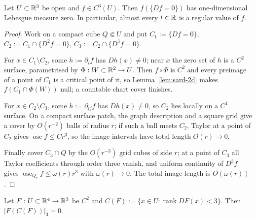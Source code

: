 \begin{theorem}\label{thm:sard-3d}
Let $U\subset\mathbb R^3$ be open and $f\in C^3(U)$.  Then $f(\{Df=0\})$ has
one-dimensional Lebesgue measure zero.  In particular, almost every
$t\in\mathbb R$ is a regular value of $f$.
\end{theorem}

\begin{proof}
Work on a compact cube $Q\Subset U$ and put
$C_1:=\{Df=0\}$, $C_2:=C_1\cap\{D^2f=0\}$, $C_3:=C_2\cap\{D^3f=0\}$.

For $x\in C_1\setminus C_2$, some $h:=\partial_if$ has $Dh(x)\ne0$; near $x$
the zero set of $h$ is a $C^2$ surface, parametrised by $\Phi:W\subset\mathbb R^2\to U$.
Then $f\circ\Phi$ is $C^2$ and every preimage of a point of $C_1$ is a
critical point of it, so Lemma~\ref{lem:sard-2d} makes
$f(C_1\cap\Phi(W))$ null; a countable chart cover finishes.

For $x\in C_2\setminus C_3$, some $h:=\partial_{ij}f$ has $Dh(x)\ne0$, so
$C_2$ lies locally on a $C^1$ surface.  On a compact surface patch, the graph
description and a square grid give a cover by $O(r^{-2})$ balls of radius
$r$; if such a ball meets $C_2$, Taylor at a point of $C_2$ gives
$\operatorname{osc}f\le Cr^3$, so the image intervals have total length
$O(r)\to0$.

Finally cover $C_3\cap Q$ by the $O(r^{-3})$ grid cubes of side $r$; at a
point of $C_3$ all Taylor coefficients through order three vanish, and
uniform continuity of $D^3f$ gives
$\operatorname{osc}_{Q_r}f\le\omega(r)r^3$ with $\omega(r)\to0$.  The total
image length is $O(\omega(r))$.
\end{proof}

\begin{theorem}\label{thm:sard-4to3}
Let $F:U\subset\mathbb R^4\to\mathbb R^3$ be $C^2$ and
$C(F):=\{x\in U:\operatorname{rank}DF(x)<3\}$.  Then $|F(C(F))|_3=0$.
\end{theorem}

